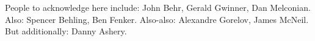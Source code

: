 

\clearpage
\begin{acknowledgement}
People to acknowledge here include:  John Behr, Gerald Gwinner, Dan Melconian.  Also:  Spencer Behling, Ben Fenker.  Also-also: Alexandre Gorelov, James McNeil.  But additionally:  Danny Ashery.
\end{acknowledgement}
